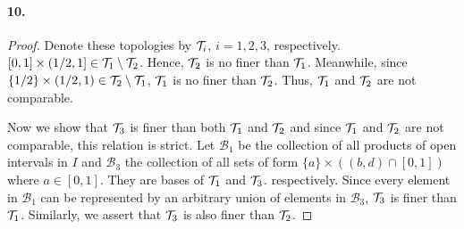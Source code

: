   \paragraph{10.}
  \begin{proof}
    Denote these topologies by $\mathcal{T}_i$, $i=1,2,3$, respectively. $[0,1]\times
    (1/2,1]\in\mathcal{T}_1\setminus\mathcal{T}_2$. Hence, $\mathcal{T}_2$ is no finer than $\mathcal{T}_1$. 
    Meanwhile, since $\{1/2\}\times(1/2,1)\in\mathcal{T}_2\setminus\mathcal{T}_1$, $\mathcal{T}_1$ is 
    no finer than $\mathcal{T}_2$. Thus, $\mathcal{T}_1$ and $\mathcal{T}_2$ are not comparable.\par
    Now we show that $\mathcal{T}_3$ is finer than both $\mathcal{T}_1$ and $\mathcal{T}_2$ and since
    $\mathcal{T}_1$ and $\mathcal{T}_2$ are not comparable, this relation is strict. Let 
    $\mathcal{B}_1$ be the collection of all products of open intervals in 
    $I$ and $\mathcal{B}_3$ the collection of all sets of form $\{a\}\times
    ((b,d)\cap[0,1])$ where $a\in[0,1]$. They are bases of $\mathcal{T}_1$ and $\mathcal{T}_3$.
    respectively. Since every element in $\mathcal{B}_1$ can be represented by
    an arbitrary union of elements in $\mathcal{B}_3$, $\mathcal{T}_3$ is finer than
    $\mathcal{T}_1$. Similarly, we assert that $\mathcal{T}_3$ is also finer than $\mathcal{T}_2$.
  \end{proof}






















